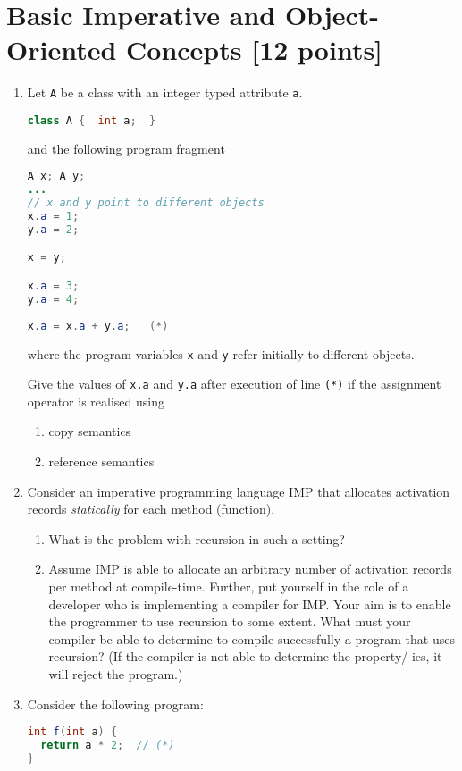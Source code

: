 \documentclass{article}
\begin{document}
\section{Basic Imperative and Object-Oriented Concepts [12 points]}
\lstset{language=Java, columns=flexible}

\begin{enumerate}
\item Let \lstinline!A! be a class with an integer typed attribute
  \lstinline!a!.
\begin{lstlisting}[language=Java, columns=flexible]
class A {  int a;  }
\end{lstlisting}

and the following program fragment
\begin{lstlisting}[language=Java, columns=flexible] 
A x; A y;
...
// x and y point to different objects
x.a = 1;
y.a = 2;

x = y;

x.a = 3;
y.a = 4;
      
x.a = x.a + y.a;   (*)
\end{lstlisting}
where the program variables \lstinline!x! and \lstinline!y! refer
initially to different objects.

Give the values of \lstinline!x.a! and \lstinline!y.a! after execution
of line \lstinline!(*)! if the assignment operator is realised using
\begin{enumerate}
  \item copy semantics 
  \item reference semantics 
\end{enumerate}
\item Consider an imperative programming language \textsf{IMP} that
  allocates activation records \emph{statically} for each method
  (function). 
  \begin{enumerate}
  \item What is the problem with recursion in such a setting?  
  \item Assume \textsf{IMP} is able to allocate an arbitrary number of
    activation records per method at compile-time. Further, put
    yourself in the role of a developer who is implementing a compiler
    for \textsf{IMP}. Your aim is to enable the programmer to use
    recursion to some extent. What must your compiler be able to
    determine to compile successfully a program that uses recursion?
    (If the compiler is not able to determine the property/-ies, it
    will reject the program.)
 \end{enumerate}
\item Consider the following program:
\begin{lstlisting}[language=Java, columns=flexible] 
int f(int a) {
  return a * 2;  // (*)
} 


\end{lstlisting}
\end{enumerate}
\end{document}
